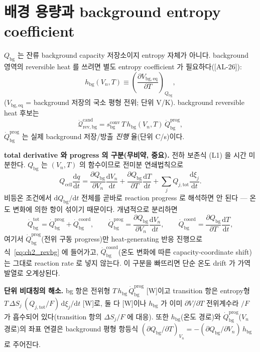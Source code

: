 \documentclass[11pt,a4paper]{article}
\newcommand{\dd}{\mathrm{d}}
\newcommand{\eq}{\mathrm{eq}}
\newcommand{\bg}{\mathrm{bg}}
\newcommand{\cell}{\mathrm{cell}}
\newcommand{\tot}{\mathrm{tot}}
\newcommand{\rev}{\mathrm{rev}}
\newcommand{\cand}{\mathrm{cand}}
\newcommand{\conv}{\mathrm{conv}}
\newcommand{\prog}{\mathrm{prog}}
\newcommand{\coord}{\mathrm{coord}}
\newcommand{\AL}[1]{\textsf{[AL-#1]}}
\begin{document}
\section{배경 용량과 background entropy coefficient}\label{sec:ch2_bg}
$Q_\bg$ 는 잔류 background capacity 저장소이지 entropy 자체가 아니다. background 영역의 reversible heat 를
쓰려면 별도 entropy coefficient 가 필요하다(\AL{26}):
\begin{equation}
h_\bg(V_n,T)\equiv\left(\frac{\partial V_{\bg,\eq}}{\partial T}\right)_{Q_\bg},
\label{eq:ch2_hbg}
\end{equation}
($V_{\bg,\eq}$ = background 저장의 국소 평형 전위; 단위 V/K). background reversible heat 후보는
\begin{equation}
\dot{\mathcal Q}_{\rev,\bg}^{\cand}=s_\bg^{\conv}\,T\,h_\bg(V_n,T)\,\dot Q_\bg^{\prog},
\label{eq:ch2_revbg}
\end{equation}
$\dot Q_\bg^{\prog}$ 는 실제 background 저장/방출 \emph{진행} 율(단위 C/s)이다.

\textbf{total derivative 와 progress 의 구분(무비약, 중요).} 전하 보존식 (L1) 을 시간 미분한다. $Q_\bg$ 는
$(V_n,T)$ 의 함수이므로 전미분 연쇄법칙으로
\begin{equation}
Q_\cell\frac{\dd q}{\dd t}=\frac{\partial Q_\bg}{\partial V_n}\frac{\dd V_n}{\dd t}+\frac{\partial Q_\bg}{\partial T}\frac{\dd T}{\dd t}
+\sum_jQ_{j,\tot}\frac{\dd\xi_j}{\dd t}.
\label{eq:ch2_dQdt}
\end{equation}
비등온 조건에서 $\dd Q_\bg/\dd t$ 전체를 곧바로 reaction progress 로 해석하면 안 된다 — 온도 변화에 의한 항이
섞이기 때문이다. 개념적으로 분리하면
\begin{equation}
\dot Q_\bg^{\mathrm{tot}}=\dot Q_\bg^{\prog}+\dot Q_\bg^{\coord},\qquad
\dot Q_\bg^{\prog}=\frac{\partial Q_\bg}{\partial V_n}\frac{\dd V_n}{\dd t},\qquad
\dot Q_\bg^{\coord}=\frac{\partial Q_\bg}{\partial T}\frac{\dd T}{\dd t},
\label{eq:ch2_bgsplit}
\end{equation}
여기서 $\dot Q_\bg^{\prog}$(전위 구동 progress)만 heat-generating 반응 진행으로 식~\eqref{eq:ch2_revbg} 에
들어가고, $\dot Q_\bg^{\coord}$(온도 변화에 따른 capacity-coordinate shift)는 그대로 reaction rate 로 넣지
않는다. 이 구분을 빠뜨리면 단순 온도 drift 가 가역 발열로 오계상된다.

\textbf{단위 비대칭의 해소.} bg 항은 전위형 $T\,h_\bg\,\dot Q_\bg^{\prog}$ [W]이고 transition 항은 entropy형
$T\,\Delta S_j\,(Q_{j,\tot}/F)\,\dd\xi_j/\dd t$ [W]로, 둘 다 [W]이나 $h_\bg$ 가 이미 $\partial V/\partial T$
전위계수라 $/F$ 가 흡수되어 있다(transition 항의 $\Delta S_j/F$ 에 대응). 또한 $h_\bg$(온도 경로)와
$\dot Q_\bg^{\prog}$($V_n$ 경로)의 좌표 연결은 background 평형 항등식
$(\partial Q_\bg/\partial T)_{V_n}=-(\partial Q_\bg/\partial V_n)\,h_\bg$ 로 주어진다.
\end{document}
